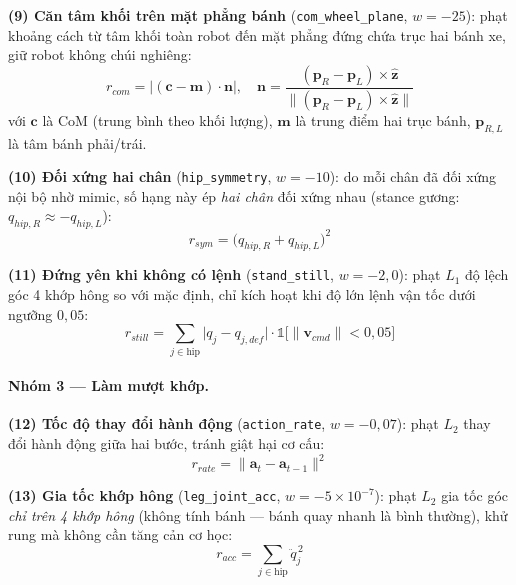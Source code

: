 \textbf{(9) Căn tâm khối trên mặt phẳng bánh} (\texttt{com\_wheel\_plane},
$w=-25$): phạt khoảng cách từ tâm khối toàn robot đến mặt phẳng đứng chứa
trục hai bánh xe, giữ robot không chúi nghiêng:
\begin{equation}
    r_{com} = \bigl|(\mathbf{c}-\mathbf{m})\cdot\mathbf{n}\bigr|,\quad
    \mathbf{n}=\frac{(\mathbf{p}_R-\mathbf{p}_L)\times\hat{\mathbf{z}}}
                    {\lVert(\mathbf{p}_R-\mathbf{p}_L)\times\hat{\mathbf{z}}\rVert}
    \label{eq:rew_com}
\end{equation}
với $\mathbf{c}$ là CoM (trung bình theo khối lượng), $\mathbf{m}$ là trung
điểm hai trục bánh, $\mathbf{p}_{R,L}$ là tâm bánh phải/trái.

\textbf{(10) Đối xứng hai chân} (\texttt{hip\_symmetry}, $w=-10$): do mỗi chân
đã đối xứng nội bộ nhờ mimic, số hạng này ép \emph{hai chân} đối xứng nhau
(stance gương: $q_{hip,R}\approx-q_{hip,L}$):
\begin{equation}
    r_{sym} = \bigl(q_{hip,R} + q_{hip,L}\bigr)^2
    \label{eq:rew_symmetry}
\end{equation}

\textbf{(11) Đứng yên khi không có lệnh} (\texttt{stand\_still}, $w=-2{,}0$):
phạt $L_1$ độ lệch góc 4 khớp hông so với mặc định, chỉ kích hoạt khi độ lớn
lệnh vận tốc dưới ngưỡng $0{,}05$:
\begin{equation}
    r_{still} = \sum_{j\in\text{hip}}\!\bigl|q_j - q_{j,def}\bigr|
    \cdot\mathbb{1}\!\bigl[\|\mathbf{v}_{cmd}\| < 0{,}05\bigr]
    \label{eq:rew_still}
\end{equation}

\paragraph{Nhóm 3 --- Làm mượt khớp.}

\textbf{(12) Tốc độ thay đổi hành động} (\texttt{action\_rate}, $w=-0{,}07$):
phạt $L_2$ thay đổi hành động giữa hai bước, tránh giật hại cơ cấu:
\begin{equation}
    r_{rate} = \|\mathbf{a}_t - \mathbf{a}_{t-1}\|^2
    \label{eq:rew_rate}
\end{equation}

\textbf{(13) Gia tốc khớp hông} (\texttt{leg\_joint\_acc},
$w=-5{\times}10^{-7}$): phạt $L_2$ gia tốc góc \emph{chỉ trên 4 khớp hông}
(không tính bánh --- bánh quay nhanh là bình thường), khử rung mà không cần
tăng cản cơ học:
\begin{equation}
    r_{acc} = \sum_{j\in\text{hip}}\ddot{q}_j^{\,2}
    \label{eq:rew_acc}
\end{equation}

